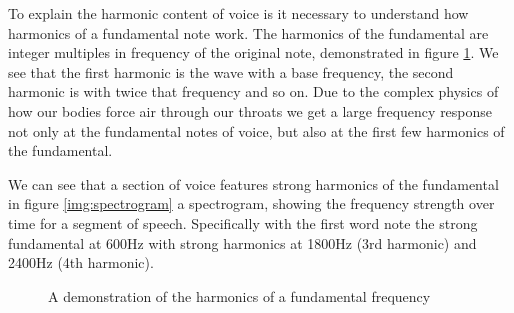 \documentclass[ %
                    author={Sam Phippen},
                supervisor={Dr. Rafal Bogacz},
                     title={Real time voice activity detectors in noisy personal computing environments},
                  subtitle={},
                    degree={MEng},
                      year={2012} ]{thesis}
\begin{document}
To explain the harmonic content of voice is it necessary to understand how
harmonics of a fundamental note work. The harmonics of the fundamental are
integer multiples in frequency of the original note, demonstrated in figure
\ref{img:harmonics}. We see that the first harmonic is the wave with a base
frequency, the second harmonic is with twice that frequency and so on. Due to
the complex physics of how our bodies force air through our throats we get a
large frequency response not only at the fundamental notes of voice, but also
at the first few harmonics of the fundamental.

We can see that a section of voice features strong harmonics of the fundamental
in figure \ref{img:spectrogram} a spectrogram, showing the frequency strength
over time for a segment of speech. Specifically with the first word note the
strong fundamental at 600Hz with strong harmonics at 1800Hz (3rd harmonic) and
2400Hz (4th harmonic).

\begin{figure}
    \caption{A demonstration of the harmonics of a fundamental frequency}
    \label{img:harmonics}
\end{figure}
\end{document}
